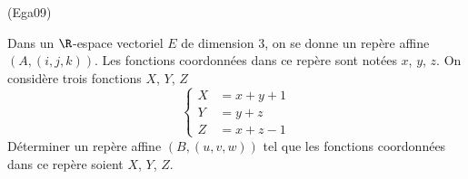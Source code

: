 \begin{tiny}(Ega09)\end{tiny} Dans un $\R$-espace vectoriel $E$ de dimension $3$, on se donne un repère affine $(A,(i,j,k))$. Les fonctions coordonnées dans ce repère sont notées $x$, $y$, $z$.\newline
On considère trois fonctions $X$, $Y$, $Z$
\begin{displaymath}
\left\lbrace 
\begin{aligned}
  X &= x+y+1 \\ Y &= y + z \\ Z &= x + z - 1
\end{aligned}
\right. 
\end{displaymath}
Déterminer un repère affine $(B,(u,v,w))$ tel que les fonctions coordonnées dans ce repère soient $X$, $Y$, $Z$.

